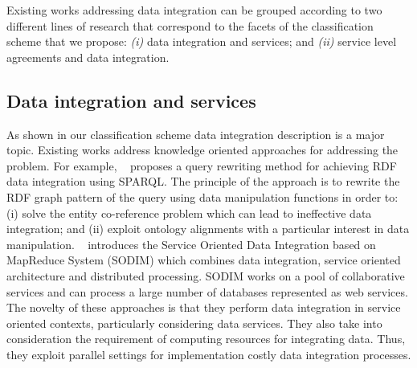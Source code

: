 Existing works addressing data integration can be grouped according to  two different lines of research that correspond to the facets of the  classification scheme that we propose:
\textit{(i)} data integration and services; and
\textit{(ii)} service level agreements and data integration. 


\subsection{Data integration and services}

As shown in our classification scheme data integration description is a major topic.  Existing works address knowledge oriented approaches for addressing the problem. For example, ~\cite{075} proposes a  query rewriting method for achieving RDF data integration
using SPARQL. The principle of the approach is to rewrite the RDF graph pattern of the query using data manipulation functions in order to: (i) solve 
the entity co-reference problem which can lead to ineffective data integration; 
and (ii) exploit ontology alignments with a particular interest in data manipulation. 
~\cite{078} introduces the  Service 
Oriented Data Integration based on MapReduce  System (SODIM)  which combines data integration,
service oriented architecture and distributed processing. SODIM works on a pool of collaborative services and can 
process a large number of databases represented as web services. 
The novelty of these approaches is that they perform data integration in service oriented contexts, particularly considering data services. They also take into consideration the requirement of computing resources for integrating data. Thus, they exploit parallel settings for implementation costly data integration processes. 


